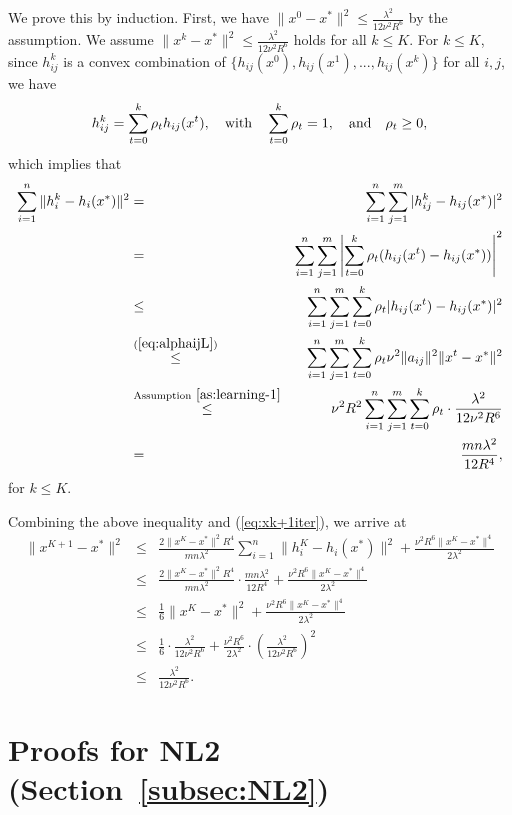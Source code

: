 \documentclass[10pt]{article}
\newcommand{\newalpha}{h}
\begin{document}
We prove this by induction. First, we have $\|x^0 - x^*\|^2 \leq \frac{\lambda^2}{12\nu^2R^6}$ by the assumption. We assume $\|x^k - x^*\|^2 \leq \frac{\lambda^2}{12\nu^2R^6}$ holds for all $k \leq K$. For $k\leq K$, since $h_{ij}^k$ is a convex combination of $\{  \newalpha_{ij}(x^0), \newalpha_{ij}(x^1), ..., \newalpha_{ij}(x^k)  \}$ for all $i,j$, we have 
$$
h_{ij}^k = \sum_{t=0}^k \rho_t \newalpha_{ij}(x^t), \quad {\rm with}\quad  \sum_{t=0}^k\rho_t = 1, \quad {\rm and} \quad \rho_t \geq 0, 
$$
which implies that 
\begin{eqnarray*}
	\sum_{i=1}^n\|h_i^k - \newalpha_i(x^*)\|^2 &=& \sum_{i=1}^n \sum_{j=1}^m |h_{ij}^k - \newalpha_{ij}(x^*)|^2 \\
	&=&  \sum_{i=1}^n \sum_{j=1}^m \left|  \sum_{t=0}^k \rho_t (\newalpha_{ij}(x^t) - \newalpha_{ij}(x^*))  \right|^2 \\ 
	&\leq&  \sum_{i=1}^n \sum_{j=1}^m  \sum_{t=0}^k \rho_t | \newalpha_{ij}(x^t) - \newalpha_{ij}(x^*) |^2 \\ 
	&\overset{(\ref{eq:alphaijL})}{\leq}&  \sum_{i=1}^n \sum_{j=1}^m  \sum_{t=0}^k \rho_t \nu^2 \|a_{ij}\|^2 \|x^t - x^*\|^2 \\ 
	&\overset{\text{Assumption}~\ref{as:learning-1}}{\leq}& \nu^2 R^2 \sum_{i=1}^n \sum_{j=1}^m  \sum_{t=0}^k \rho_t \cdot \frac{\lambda^2}{12\nu^2R^6} \\
	&=& \frac{mn \lambda^2}{12R^4}, 
\end{eqnarray*}
for $k\leq K$. 

Combining the above inequality and (\ref{eq:xk+1iter}), we arrive at 
\begin{eqnarray*}
	\|x^{K+1} - x^*\|^2 &\leq& \frac{2\|x^K-x^*\|^2 R^4}{mn\lambda^2} \sum_{i=1}^n \|h_i^K - \newalpha_i(x^*)\|^2 + \frac{ \nu^2 R^6\|x^K-x^*\|^4}{2\lambda^2} \\
	&\leq&  \frac{2\|x^K-x^*\|^2 R^4}{mn\lambda^2} \cdot  \frac{mn \lambda^2}{12R^4} +  \frac{ \nu^2 R^6\|x^K-x^*\|^4}{2\lambda^2} \\
	&\leq& \frac{1}{6}\|x^K - x^*\|^2 +  \frac{ \nu^2 R^6\|x^K-x^*\|^4}{2\lambda^2} \\
	&\leq& \frac{1}{6} \cdot \frac{\lambda^2}{12\nu^2R^6} + \frac{ \nu^2 R^6}{2\lambda^2} \cdot \left(\frac{\lambda^2}{12\nu^2R^6} \right)^2 \\ 
	&\leq& \frac{\lambda^2}{12\nu^2R^6}. 
\end{eqnarray*}





\clearpage
\section{Proofs for {\sf NL2} (Section~\ref{subsec:NL2})}
 
\end{document}
